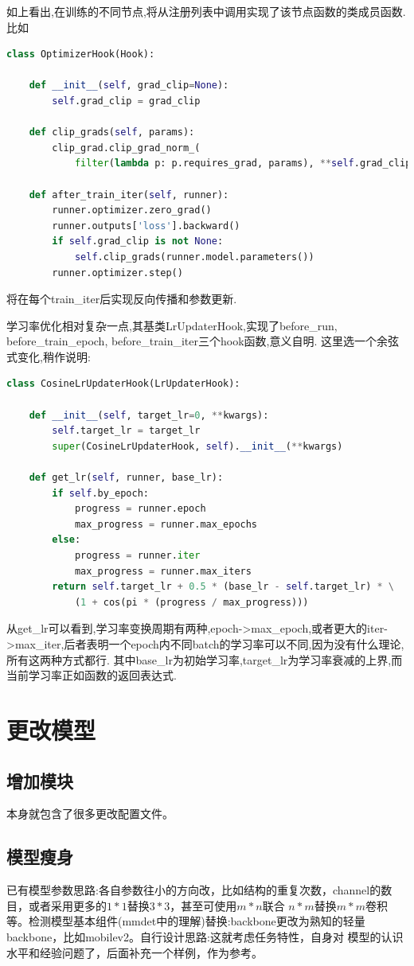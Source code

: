\documentclass[UTF8]{ctexart}
\begin{document}
如上看出,在训练的不同节点,将从注册列表中调用实现了该节点函数的类成员函数.比如
\lstset{style=mystyle}
\begin{lstlisting}[language=Python]
class OptimizerHook(Hook):

    def __init__(self, grad_clip=None):
        self.grad_clip = grad_clip

    def clip_grads(self, params):
        clip_grad.clip_grad_norm_(
            filter(lambda p: p.requires_grad, params), **self.grad_clip)

    def after_train_iter(self, runner):
        runner.optimizer.zero_grad()
        runner.outputs['loss'].backward()
        if self.grad_clip is not None:
            self.clip_grads(runner.model.parameters())
        runner.optimizer.step()
\end{lstlisting}
将在每个train\_iter后实现反向传播和参数更新.

学习率优化相对复杂一点,其基类LrUpdaterHook,实现了before\_run, before\_train\_epoch, before\_train\_iter三个hook函数,意义自明.
这里选一个余弦式变化,稍作说明:

\lstset{style=mystyle}
\begin{lstlisting}[language=Python]
class CosineLrUpdaterHook(LrUpdaterHook):

    def __init__(self, target_lr=0, **kwargs):
        self.target_lr = target_lr
        super(CosineLrUpdaterHook, self).__init__(**kwargs)

    def get_lr(self, runner, base_lr):
        if self.by_epoch:
            progress = runner.epoch
            max_progress = runner.max_epochs
        else:
            progress = runner.iter
            max_progress = runner.max_iters
        return self.target_lr + 0.5 * (base_lr - self.target_lr) * \
			(1 + cos(pi * (progress / max_progress)))
\end{lstlisting}
从get\_lr可以看到,学习率变换周期有两种,epoch->max\_epoch,或者更大的iter->max\_iter,后者表明一个epoch内不同batch的学习率可以不同,因为没有什么理论,所有这两种方式都行.
其中base\_lr为初始学习率,target\_lr为学习率衰减的上界,而当前学习率正如函数的返回表达式.

\section{更改模型}
\subsection{增加模块}
本身就包含了很多更改配置文件。
\subsection{模型瘦身}
已有模型参数思路:各自参数往小的方向改，比如结构的重复次数，channel的数目，或者采用更多的$1*1$替换$3*3$，甚至可使用$m*n $联合
$n*m$替换$m*m$卷积等。检测模型基本组件(mmdet中的理解)替换:backbone更改为熟知的轻量backbone，比如mobilev2。自行设计思路:这就考虑任务特性，自身对
模型的认识水平和经验问题了，后面补充一个样例，作为参考。
\end{document}

